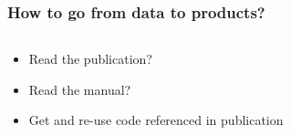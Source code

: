 \begin{frame}[t]
\frametitle{How to go from data to products?}

\begin{columns}[T]
\begin{column}{0.45\textwidth}
\begin{itemize}
\item<2-> Read the publication?
\item<3-> Read the manual?
\item<4-> Get and re-use code referenced in publication
\end{itemize}

\end{column}
\begin{column}{0.55\textwidth} 


\end{column}
\end{columns}

\end{frame}

